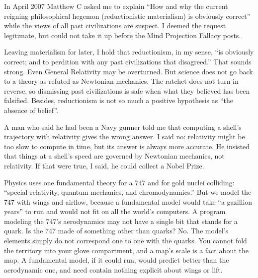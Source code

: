 
In April 2007 Matthew C asked me to explain ``How and why the current reigning philosophical hegemon (reductionistic materialism) is obviously correct'' while the views of all past civilizations are suspect. I deemed the request legitimate, but could not take it up before the Mind Projection Fallacy posts. 

Leaving materialism for later, I hold that reductionism, in my sense, ``is obviously correct; and to perdition with any past civilizations that disagreed.'' That sounds strong. Even General Relativity may be overturned. But science does not go back to a theory as refuted as Newtonian mechanics. The ratchet does not turn in reverse, so dismissing past civilizations is safe when what they believed has been falsified.  Besides, reductionism is not so much a positive hypothesis as ``the absence of belief''.

A man who said he had been a Navy gunner told me that computing a shell's trajectory with relativity gives the wrong answer. I said no: relativity might be too slow to compute in time, but its answer is always more accurate. He insisted that things at a shell's speed are governed by Newtonian mechanics, not relativity. If that were true, I said, he could collect a Nobel Prize. 

Physics uses one fundamental theory for a 747 and for gold nuclei colliding: ``special relativity, quantum mechanics, and chromodynamics.''  But we model the 747 with wings and airflow, because a fundamental model would take ``a gazillion years'' to run and would not fit on all the world's computers. A program modeling the 747's aerodynamics may not have a single bit that stands for a quark. Is the 747 made of something other than quarks? No. The model's elements simply do not correspond one to one with the quarks. You cannot fold the territory into your glove compartment, and a map's scale is a fact about the map. A fundamental model, if it could run, would predict better than the aerodynamic one, and need contain nothing explicit about wings or lift. 

